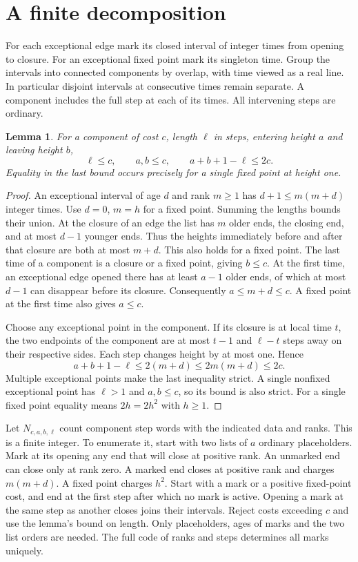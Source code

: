 \documentclass[11pt,letterpaper]{article}
\newtheorem{lemma}[theorem]{Lemma}
\begin{document}
\section{A finite decomposition}
For each exceptional edge mark its closed interval of integer times from opening to closure. For an exceptional fixed point mark its singleton time. Group the intervals into connected components by overlap, with time viewed as a real line. In particular disjoint intervals at consecutive times remain separate. A component includes the full step at each of its times. All intervening steps are ordinary.

\begin{lemma}\label{bound}
For a component of cost $c$, length $\ell$ in steps, entering height $a$ and leaving height $b$,
\[
 \ell\le c,\qquad a,b\le c,\qquad a+b+1-\ell\le 2c .
\]
Equality in the last bound occurs precisely for a single fixed point at height one.
\end{lemma}
\begin{proof}
An exceptional interval of age $d$ and rank $m\ge1$ has $d+1\le m(m+d)$ integer times. Use $d=0$, $m=h$ for a fixed point. Summing the lengths bounds their union. At the closure of an edge the list has $m$ older ends, the closing end, and at most $d-1$ younger ends. Thus the heights immediately before and after that closure are both at most $m+d$. This also holds for a fixed point. The last time of a component is a closure or a fixed point, giving $b\le c$. At the first time, an exceptional edge opened there has at least $a-1$ older ends, of which at most $d-1$ can disappear before its closure. Consequently $a\le m+d\le c$. A fixed point at the first time also gives $a\le c$.

Choose any exceptional point in the component. If its closure is at local time $t$, the two endpoints of the component are at most $t-1$ and $\ell-t$ steps away on their respective sides. Each step changes height by at most one. Hence
\[
 a+b+1-\ell\le 2(m+d)\le2m(m+d)\le2c .
\]
Multiple exceptional points make the last inequality strict. A single nonfixed exceptional point has $\ell>1$ and $a,b\le c$, so its bound is also strict. For a single fixed point equality means $2h=2h^2$ with $h\ge1$.
\end{proof}

Let $N_{c,a,b,\ell}$ count component step words with the indicated data and ranks. This is a finite integer. To enumerate it, start with two lists of $a$ ordinary placeholders. Mark at its opening any end that will close at positive rank. An unmarked end can close only at rank zero. A marked end closes at positive rank and charges $m(m+d)$. A fixed point charges $h^2$. Start with a mark or a positive fixed-point cost, and end at the first step after which no mark is active. Opening a mark at the same step as another closes joins their intervals. Reject costs exceeding $c$ and use the lemma's bound on length. Only placeholders, ages of marks and the two list orders are needed. The full code of ranks and steps determines all marks uniquely.
\end{document}
